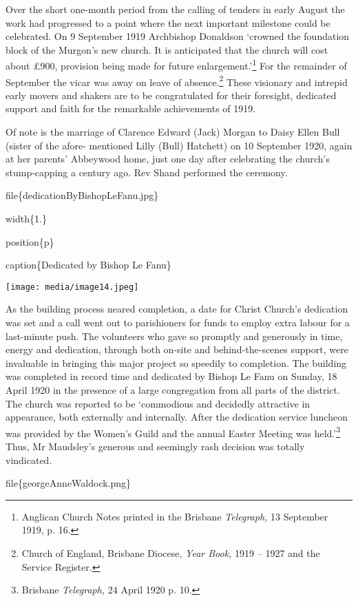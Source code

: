 Over the short one-month period from the calling of tenders in early August the work had progressed to a point where the next important milestone could be celebrated. On 9 September 1919 Archbishop Donaldson `crowned the foundation block of the Murgon's new church. It is anticipated that the church will cost about £900, provision being made for future enlargement.'\footnote{Anglican Church Notes printed in the Brisbane \emph{Telegraph,} 13 September 1919, p. 16.} For the remainder of September the vicar was away on leave of absence.\footnote{Church of England, Brisbane Diocese, \emph{Year Book,} 1919 -- 1927 and the Service Register.} These visionary and intrepid early movers and shakers are to be congratulated for their foresight, dedicated support and faith for the remarkable achievements of 1919.

Of note is the marriage of Clarence Edward (Jack) Morgan to Daisy Ellen Bull (sister of the afore- mentioned Lilly (Bull) Hatchett) on 10 September 1920, again at her parents' Abbeywood home, just one day after celebrating the church's stump-capping a century ago. Rev Shand performed the ceremony.

file\{dedicationByBishopLeFanu.jpg\}

width\{1.\}

position\{p\}

caption\{Dedicated by Bishop Le Fanu\}

\texttt{[image: media/image14.jpeg]}

As the building process neared completion, a date for Christ Church's dedication was set and a call went out to parishioners for funds to employ extra labour for a last-minute push. The volunteers who gave so promptly and generously in time, energy and dedication, through both on-site and behind-the-scenes support, were invaluable in bringing this major project so speedily to completion. The building was completed in record time and dedicated by Bishop Le Fanu on Sunday, 18 April 1920 in the presence of a large congregation from all parts of the district. The church was reported to be `commodious and decidedly attractive in appearance, both externally and internally. After the dedication service luncheon was provided by the Women's Guild and the annual Easter Meeting was held.'\footnote{Brisbane \emph{Telegraph,} 24 April 1920 p. 10.} Thus, Mr Maudsley's generous and seemingly rash decision was totally vindicated.

file\{georgeAnneWaldock.png\}

